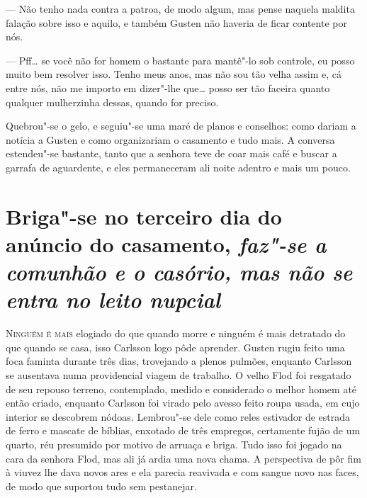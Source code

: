 --- Não tenho nada contra a patroa, de modo algum, mas pense naquela maldita falação
sobre isso e aquilo, e também Gusten não haveria de ficar contente por nós.

--- Pff\ldots{} se você não for homem o bastante para mantê"-lo sob controle, eu posso muito bem resolver
isso. Tenho meus anos, mas não sou tão velha assim e, cá entre nós, não me importo em dizer"-lhe que\ldots{}
posso ser tão faceira quanto qualquer mulherzinha dessas, quando for preciso.

Quebrou"-se o gelo, e seguiu"-se uma maré de planos e conselhos: como dariam
a notícia a Gusten e como organizariam o casamento e tudo mais. A
conversa estendeu"-se bastante, tanto que a senhora teve de coar mais café e
buscar a garrafa de aguardente, e eles permaneceram ali noite adentro e mais um pouco.

\chapter[Briga"-se no terceiro dia do anúncio\ldots]{Briga"-se no terceiro dia do
anúncio do casamento, \emph{faz"-se a comunhão e o casório, mas não se entra no leito nupcial}}

\textsc{Ninguém é mais} elogiado do que quando morre e ninguém é mais detratado
do que quando se casa, isso Carlsson logo pôde aprender. Gusten rugiu feito uma foca
faminta durante três dias, trovejando a plenos pulmões, enquanto Carlsson se
ausentava numa providencial viagem de trabalho. O velho Flod foi
resgatado de seu repouso terreno, contemplado, medido e considerado o melhor
homem até então criado, enquanto Carlsson foi virado pelo avesso feito roupa usada, em
cujo interior se descobrem nódoas. Lembrou"-se dele como reles
estivador de estrada de ferro e mascate de bíblias, enxotado de três empregos,
certamente fujão de um quarto, réu presumido por motivo de arruaça e briga. Tudo
isso foi jogado na cara da senhora Flod, mas ali já ardia uma nova chama. A
perspectiva de pôr fim à viuvez lhe dava novos ares e ela parecia reavivada e
com sangue novo nas faces, de modo que suportou tudo sem pestanejar.

